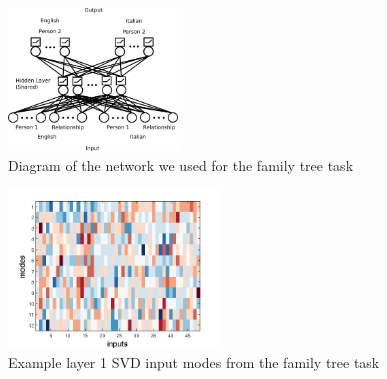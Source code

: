 \documentclass[10pt,letterpaper]{article}
\begin{document}
\begin{figure}
\centering
\includegraphics[width=0.4\textwidth]{figures/family_tree_network_diagram.png}
\caption{Diagram of the network we used for the family tree task}
\label{family_tree_network_diagram}
\end{figure}

\begin{figure}
\centering
\includegraphics[width=0.5\textwidth]{figures/ft_input_mode_example.png}
\caption{Example layer 1 SVD input modes from the family tree task}
\label{ft_input_mode_example}
\end{figure}
\end{document}
